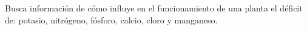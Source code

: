 Busca información de cómo influye en el funcionamiento de una planta el déficit de: potasio, nitrógeno, fósforo, calcio, cloro y manganeso.

\begin{solutionbox}{3cm}

\end{solutionbox}